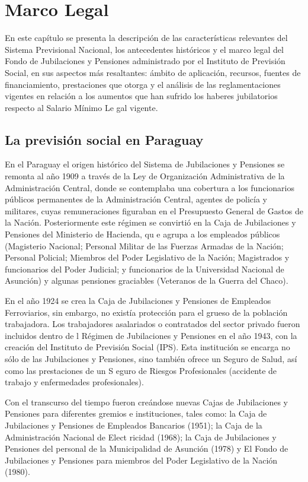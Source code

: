 \section{Marco Legal}

En este capítulo se presenta la descripción de las características
relevantes del Sistema Previsional Nacional, los antecedentes históricos
y el marco legal del Fondo de Jubilaciones y Pensiones administrado por
el Instituto de Previsión Social, en sus aspectos más resaltantes:
ámbito de aplicación, recursos, fuentes de financiamiento, prestaciones
que otorga y el análisis de las reglamentaciones vigentes en relación a
los aumentos que han sufrido los haberes jubilatorios respecto al
Salario Mínimo Le gal vigente.

\subsection{La previsión social en Paraguay}

En el Paraguay el origen histórico del Sistema de Jubilaciones y
Pensiones se remonta al año 1909 a través de la Ley de Organización
Administrativa de la Administración Central, donde se contemplaba una
cobertura a los funcionarios públicos permanentes de la Administración
Central, agentes de policía y militares, cuyas remuneraciones figuraban
en el Presupuesto General de Gastos de la Nación. Posteriormente este
régimen se convirtió en la Caja de Jubilaciones y Pensiones del
Ministerio de Hacienda, qu e agrupa a los empleados públicos (Magisterio
Nacional; Personal Militar de las Fuerzas Armadas de la Nación; Personal
Policial; Miembros del Poder Legislativo de la Nación; Magistrados y
funcionarios del Poder Judicial; y funcionarios de la Universidad
Nacional de Asunción) y algunas pensiones graciables (Veteranos de la
Guerra del Chaco).

En el año 1924 se crea la Caja de Jubilaciones y Pensiones de Empleados
Ferroviarios, sin embargo, no existía protección para el grueso de la
población trabajadora. Los trabajadores asalariados o contratados del
sector privado fueron incluidos dentro de l Régimen de Jubilaciones y
Pensiones en el año 1943, con la creación del Instituto de Previsión
Social (IPS). Esta institución se encarga no sólo de las Jubilaciones y
Pensiones, sino también ofrece un Seguro de Salud, así como las
prestaciones de un S eguro de Riesgos Profesionales (accidente de
trabajo y enfermedades profesionales).

Con el transcurso del tiempo fueron creándose nuevas Cajas de
Jubilaciones y Pensiones para diferentes gremios e instituciones, tales
como: la Caja de Jubilaciones y Pensiones de Empleados Bancarios (1951);
la Caja de la Administración Nacional de Elect ricidad (1968); la Caja
de Jubilaciones y Pensiones del personal de la Municipalidad de Asunción
(1978) y El Fondo de Jubilaciones y Pensiones para miembros del Poder
Legislativo de la Nación (1980).

